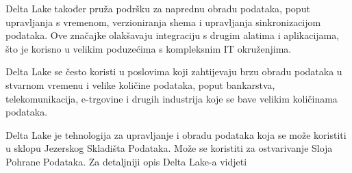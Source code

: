 Delta Lake također pruža podršku za naprednu obradu podataka, poput upravljanja
s vremenom, verzioniranja shema i upravljanja sinkronizacijom podataka. Ove
značajke olakšavaju integraciju s drugim alatima i aplikacijama, što je korisno
u velikim poduzećima s kompleksnim IT okruženjima.

Delta Lake se često koristi u poslovima koji zahtijevaju brzu obradu podataka u
stvarnom vremenu i velike količine podataka, poput bankarstva, telekomunikacija,
e-trgovine i drugih industrija koje se bave velikim količinama podataka.

Delta Lake je tehnologija za upravljanje i obradu podataka koja se može
koristiti u sklopu Jezerskog Skladišta Podataka. Može se koristiti za
ostvarivanje Sloja Pohrane Podataka. Za detaljniji opis Delta Lake-a vidjeti \citep{deltalake2023}
